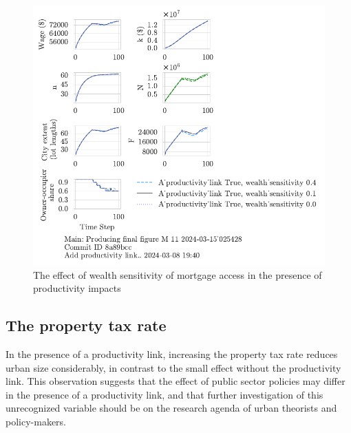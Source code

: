 \begin{figure}[h!bt]
    \centering
    \includegraphics[scale=1, trim={0 1.4cm 0 0},clip]{fig/With-productivity_link-wealth_sensitivity-025428.pdf}
    \caption{The effect of wealth sensitivity of mortgage access in the presence of productivity impacts}
    \label{fig:Productivity_link_and_wealth_sensitivity_ownership_trajectory}
\end{figure}


\newpage
\subsection{The property tax rate}
In the presence of a productivity link, increasing the property tax rate reduces urban size considerably, in contrast to the small effect without the productivity link. This observation suggests that the effect of public sector policies may differ in the presence of a productivity link, and that further investigation of this unrecognized variable should be on the research agenda of urban theorists and policy-makers.

